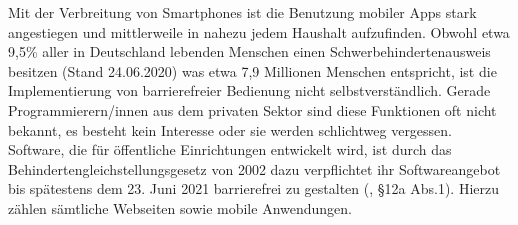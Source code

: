 Mit der Verbreitung von Smartphones ist die Benutzung mobiler Apps stark angestiegen und mittlerweile in nahezu jedem Haushalt aufzufinden. Obwohl etwa 9,5\% aller in Deutschland lebenden Menschen einen Schwerbehindertenausweis besitzen (Stand 24.06.2020)\cite{schwerbehindertenausweis} was etwa 7,9 Millionen Menschen entspricht, ist die Implementierung von barrierefreier Bedienung nicht selbstverständlich. Gerade Programmierern/innen aus dem privaten Sektor sind diese Funktionen oft nicht bekannt, es besteht kein Interesse oder sie werden schlichtweg vergessen. Software, die für öffentliche Einrichtungen entwickelt wird, ist durch das Behindertengleichstellungsgesetz von 2002 dazu verpflichtet ihr Softwareangebot bis spätestens dem 23. Juni 2021 barrierefrei zu gestalten (\cite{behindertengleichstellungsgesetz}, §12a Abs.1). Hierzu zählen sämtliche Webseiten sowie mobile Anwendungen. \\
